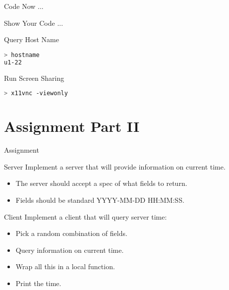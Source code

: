 \begin{frame}{Code Now ...}
\end{frame}


\begin{frame}[fragile]{Show Your Code ...}
    \begin{block}{Query Host Name}
\begin{lstlisting}[language=bash,style=mini]
> hostname
u1-22
\end{lstlisting}
    \end{block}
    \begin{block}{Run Screen Sharing}
\begin{lstlisting}[language=bash,style=mini]
> x11vnc -viewonly
\end{lstlisting}
    \end{block}
\end{frame}


\section{Assignment Part II}


\begin{frame}{Assignment}
    \begin{block}{Server}
        Implement a server that will provide information on current time.
        \begin{itemize}
            \item The server should accept a spec of what fields to return.
            \item Fields should be standard YYYY-MM-DD HH:MM:SS.
        \end{itemize}
    \end{block}

    \begin{block}{Client}
        Implement a client that will query server time:
        \begin{itemize}
            \item Pick a random combination of fields.
            \item Query information on current time.
            \item Wrap all this in a local function.
            \item Print the time.
        \end{itemize}
    \end{block}
\end{frame}


